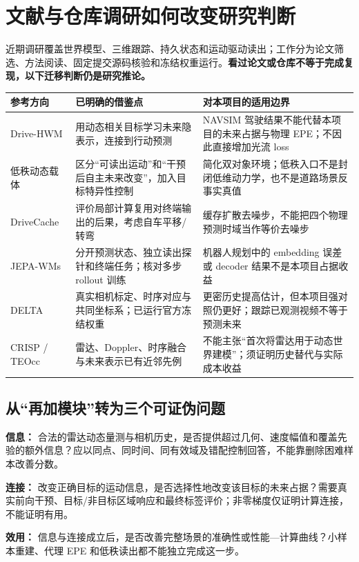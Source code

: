 \documentclass[UTF8,a4paper,11pt,fontset=none]{ctexart}
\begin{document}
\clearpage
\section{文献与仓库调研如何改变研究判断}
近期调研覆盖世界模型、三维跟踪、持久状态和运动驱动读出；工作分为论文筛选、方法阅读、固定提交源码核验和冻结权重运行。\textbf{看过论文或仓库不等于完成复现，以下迁移判断仍是研究推论。}

\begin{center}\small
\begin{tabularx}{\linewidth}{p{31mm}YY}
\toprule
参考方向 & 已明确的借鉴点 & 对本项目的适用边界\\
\midrule
Drive-HWM\cite{hwm} & 用动态相关目标学习未来隐表示，连接到行动预测 & NAVSIM 驾驶结果不能代替本项目的未来占据与物理 EPE；不因此直接增加光流 loss\\
低秩动态载体\cite{carrier} & 区分“可读出运动”和“干预后自主未来改变”，加入目标特异性控制 & 简化双对象环境；低秩入口不是封闭低维动力学，也不是道路场景反事实真值\\
DriveCache\cite{cache} & 评价局部计算复用对终端输出的后果，考虑自车平移/转弯 & 缓存扩散去噪步，不能把四个物理预测时域当作等价去噪步\\
JEPA-WMs\cite{jepa} & 分开预测状态、独立读出探针和终端任务；核对多步 rollout 训练 & 机器人规划中的 embedding 误差或 decoder 结果不是本项目占据收益\\
DELTA\cite{delta} & 真实相机标定、时序对应与共同坐标系；已运行官方冻结权重 & 更密历史提高估计，但本项目强对照仍更好；跟踪已观测视频不等于预测未来\\
CRISP / TEOcc\cite{crisp,teocc} & 雷达、Doppler、时序融合与未来表示已有近邻先例 & 不能主张“首次将雷达用于动态世界建模”；须证明历史替代与实际成本收益\\
\bottomrule
\end{tabularx}\end{center}

\subsection{从“再加模块”转为三个可证伪问题}
\textbf{信息：} 合法的雷达动态量测与相机历史，是否提供超过几何、速度幅值和覆盖先验的额外信息？应以同点、同时间、同有效域及错配控制回答，不能靠删除困难样本改善分数。

\textbf{连接：} 改变正确目标的运动信息，是否选择性地改变该目标的未来占据？需要真实前向干预、目标/非目标区域响应和最终标签评价；非零梯度仅证明计算连接，不能证明有用。

\textbf{效用：} 信息与连接成立后，是否改善完整场景的准确性或性能—计算曲线？小样本重建、代理 EPE 和低秩读出都不能独立完成这一步。
\end{document}
